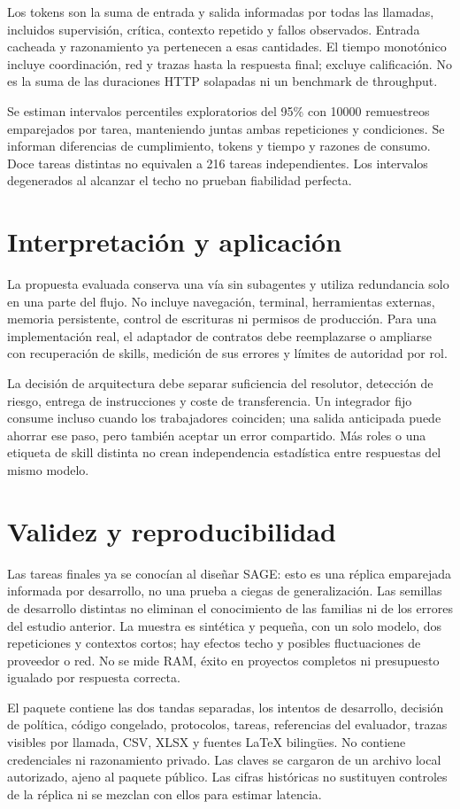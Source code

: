 \documentclass[11pt,a4paper]{article}
\begin{document}
Los tokens son la suma de entrada y salida informadas por todas las llamadas,
incluidos supervisión, crítica, contexto repetido y fallos observados. Entrada
cacheada y razonamiento ya pertenecen a esas cantidades. El tiempo monotónico
incluye coordinación, red y trazas hasta la respuesta final; excluye calificación.
No es la suma de las duraciones HTTP solapadas ni un benchmark de throughput.

Se estiman intervalos percentiles exploratorios del 95\% con 10000 remuestreos
emparejados por tarea, manteniendo juntas ambas repeticiones y condiciones.
Se informan diferencias de cumplimiento, tokens y tiempo y razones de consumo.
Doce tareas distintas no equivalen a 216 tareas independientes. Los intervalos
degenerados al alcanzar el techo no prueban fiabilidad perfecta.


\section{Interpretación y aplicación}

La propuesta evaluada conserva una vía sin subagentes y utiliza redundancia solo
en una parte del flujo. No incluye navegación, terminal, herramientas externas,
memoria persistente, control de escrituras ni permisos de producción. Para una
implementación real, el adaptador de contratos debe reemplazarse o ampliarse con
recuperación de skills, medición de sus errores y límites de autoridad por rol.

La decisión de arquitectura debe separar suficiencia del resolutor, detección de
riesgo, entrega de instrucciones y coste de transferencia. Un integrador fijo
consume incluso cuando los trabajadores coinciden; una salida anticipada puede
ahorrar ese paso, pero también aceptar un error compartido. Más roles o una
etiqueta de skill distinta no crean independencia estadística entre respuestas
del mismo modelo.

\section{Validez y reproducibilidad}
Las tareas finales ya se conocían al diseñar SAGE: esto es una réplica emparejada
informada por desarrollo, no una prueba a ciegas de generalización. Las semillas
de desarrollo distintas no eliminan el conocimiento de las familias ni de los
errores del estudio anterior. La muestra es sintética y pequeña, con un solo
modelo, dos repeticiones y contextos cortos; hay efectos techo y posibles
fluctuaciones de proveedor o red. No se mide RAM, éxito en proyectos completos
ni presupuesto igualado por respuesta correcta.

El paquete contiene las dos tandas separadas, los intentos de desarrollo, decisión
de política, código congelado, protocolos, tareas, referencias del evaluador,
trazas visibles por llamada, CSV, XLSX y fuentes LaTeX bilingües. No contiene
credenciales ni razonamiento privado. Las claves se cargaron de un archivo local
autorizado, ajeno al paquete público. Las cifras históricas no sustituyen controles
de la réplica ni se mezclan con ellos para estimar latencia.



\end{document}
